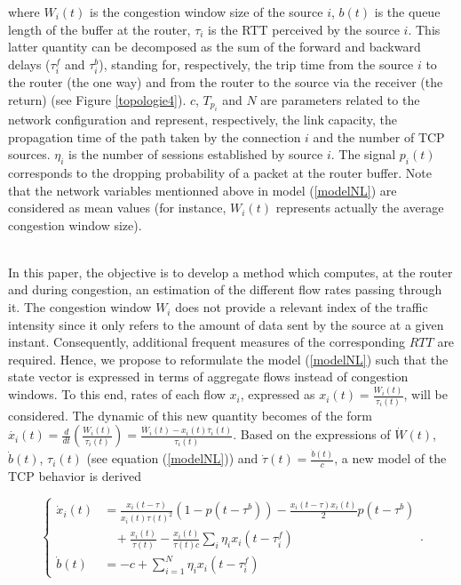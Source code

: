\documentclass[a4paper, 10pt, onecolumn]{article}
\begin{document}
where  $W_i(t)$ is the congestion window size of the source $i$, $b(t)$ is the queue length of the buffer at the router, $\tau_i$ is the RTT perceived by the source $i$. This latter quantity can be decomposed as the sum of the forward and backward delays ($\tau_i^f$ and $\tau_i^b$), standing for, respectively, the trip time from the source $i$ to the router (the one way) and from the router to the source via the receiver (the return) (see Figure \ref{topologie4}). $c$, $T_{p_i}$ and $N$ are parameters related to the network configuration and represent, respectively, the link capacity, the propagation time of the path taken by the connection $i$ and the number of TCP sources. $\eta_i$ is the number of sessions established by source $i$. The signal $p_i(t)$ corresponds to the dropping probability of a packet at the router buffer. Note that the network variables mentionned above in model (\ref{modelNL}) are considered as mean values \cite{Low02} (for instance, $W_i(t)$ represents actually the average congestion window size).\\~\indent


In this paper, the objective is to develop a method which computes, at the router and during congestion, an estimation of the different flow rates passing through it. The congestion window $W_i$ does not provide a relevant index of the traffic intensity since it only refers to the amount of data sent by the source at a given instant. Consequently, additional frequent measures of the corresponding $RTT$ are required. Hence, we propose to reformulate the model (\ref{modelNL}) such that the state vector is expressed in terms of aggregate flows instead of congestion windows. To this end, rates of each flow $x_i$, expressed as $x_i(t)=\frac{W_i(t)}{\tau_i(t)}$, will be considered. The dynamic of this new quantity becomes of the form $\dot{x_i}(t)=\frac{d}{dt}\left(\frac{W_i(t)}{\tau_i(t)}\right)=\frac{\dot{W_i}(t)-x_i(t)\dot{\tau_i}(t)}{\tau_i(t)}$. Based on the expressions of $\dot{W}(t)$, $\dot{b}(t)$, $\tau_i(t)$ (see equation (\ref{modelNL})) and $\dot{\tau}(t)=\frac{\dot{b}(t)}{c}$, a new model of the TCP behavior is derived

\begin{equation}
\label{modelNL2}
\left\{\begin{array}{rl}
\dot{x}_i(t)&=\frac{x_i(t-\tau)}{x_i(t)\tau(t)^2}(1-p(t-\tau ^b))-\frac{x_i(t-\tau)x_i(t)}{2}p(t-\tau^b)\\&~~~~+\frac{x_i(t)}{\tau(t)}-\frac{x_i(t)}{\tau(t)c}\sum_i\eta_ix_i(t-\tau^f_i)\\
\dot{b}(t)&=-c+\sum_{i=1}^N\eta_ix_i(t-\tau_i^f)
\end{array} \right.\!\!\!.
\end{equation}
\end{document}
